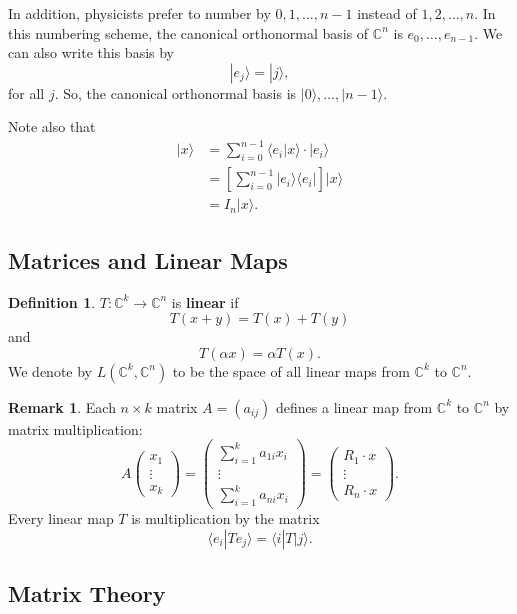\documentclass[12pt]{article}
\theoremstyle{definition}
\newtheorem*{definition}{Definition}
\newtheorem*{remark}{Remark}
\newcommand{\ket}[1]{|#1\rangle}
\newcommand{\braket}[2]{\langle #1|#2\rangle}
\newcommand{\ketbra}[2]{|#1\rangle\langle #2|}
\newcommand{\C}{\mathbb{C}}
\begin{document}
In addition, physicists prefer to number by $0, 1, \ldots, n-1$ instead of $1,2,\ldots,n$. In this numbering scheme, the canonical orthonormal basis of $\C^n$ is $e_0,\ldots,e_{n-1}$. We can also write this basis by
\[
\ket{e_j} = \ket{j},
\]
for all $j$. So, the canonical orthonormal basis is $\ket{0},\ldots,\ket{n-1}$.

Note also that
\begin{align*}
\ket{x} &= \sum_{i=0}^{n-1} \braket{e_i}{x} \cdot \ket{e_i} \\
&= \left[\sum_{i=0}^{n-1} \ketbra{e_i}{e_i}\right] \ket{x} \\
&= I_n \ket{x}.
\end{align*}

\subsection{Matrices and Linear Maps}

\begin{definition}
$T : \C^k \to \C^n$ is \textbf{linear} if
\[
T(x+y) = T(x) + T(y)
\]
and
\[
T(\alpha x) = \alpha T(x).
\]
We denote by $L(\C^k, \C^n)$ to be the space of all linear maps from $\C^k$ to $\C^n$.
\end{definition}

\begin{remark}
Each $n \times k$ matrix $A = (a_{ij})$ defines a linear map from $\C^k$ to $\C^n$ by matrix multiplication:
\[
A \begin{pmatrix} x_1 \\ \vdots \\ x_k \end{pmatrix}
= \begin{pmatrix} \sum_{i=1}^k a_{1i} x_i \\ \vdots \\ \sum_{i=1}^k a_{ni} x_i \end{pmatrix}
= \begin{pmatrix} R_1 \cdot x \\ \vdots \\ R_n \cdot x \end{pmatrix}.
\]
Every linear map $T$ is multiplication by the matrix
\[
\langle e_i | T e_j \rangle = \langle i | T | j \rangle.
\]
\end{remark}

\subsection{Matrix Theory}
\end{document}
